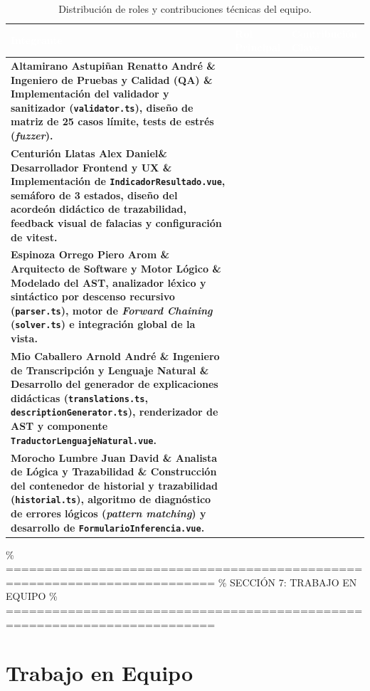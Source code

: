 \documentclass[11pt,a4paper]{article}
\begin{document}
\vspace{0.4cm}
\begin{table}[h!]
\centering
\small
\renewcommand{\arraystretch}{1.35}
\begin{tabularx}{\textwidth}{|>{\bfseries}p{4.5cm}|>{\raggedright\arraybackslash}p{3.8cm}|>{\raggedright\arraybackslash}X|}
\hline
\rowcolor{headerblue}
\textcolor{white}{Integrante} & \textcolor{white}{Rol Principal} & \textcolor{white}{Contribución Clave} \\
\hline
Altamirano Astupiñan Renatto André \& Ingeniero de Pruebas y Calidad (QA) \& Implementación del validador y sanitizador (\texttt{validator.ts}), diseño de matriz de 25 casos límite, tests de estrés (\textit{fuzzer}). \\
\hline
Centurión Llatas Alex Daniel\& Desarrollador Frontend y UX \& Implementación de \texttt{IndicadorResultado.vue}, semáforo de 3 estados, diseño del acordeón didáctico de trazabilidad, feedback visual de falacias y configuración de vitest. \\
\hline
Espinoza Orrego Piero Arom \& Arquitecto de Software y Motor Lógico \& Modelado del AST, analizador léxico y sintáctico por descenso recursivo (\texttt{parser.ts}), motor de \textit{Forward Chaining} (\texttt{solver.ts}) e integración global de la vista. \\
\hline
Mio Caballero Arnold André \& Ingeniero de Transcripción y Lenguaje Natural \& Desarrollo del generador de explicaciones didácticas (\texttt{translations.ts}, \texttt{descriptionGenerator.ts}), renderizador de AST y componente \texttt{TraductorLenguajeNatural.vue}. \\
\hline
Morocho Lumbre Juan David \& Analista de Lógica y Trazabilidad \& Construcción del contenedor de historial y trazabilidad (\texttt{historial.ts}), algoritmo de diagnóstico de errores lógicos (\textit{pattern matching}) y desarrollo de \texttt{FormularioInferencia.vue}. \\
\hline
\end{tabularx}
\caption{Distribución de roles y contribuciones técnicas del equipo.}
\end{table}

\% =========================================================================
\% SECCIÓN 7: TRABAJO EN EQUIPO
\% =========================================================================
\section{Trabajo en Equipo}
\end{document}
